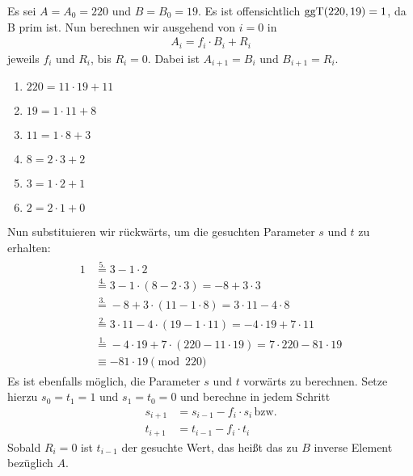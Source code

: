 \vspace{10pt}
\begin{beispiel}[EEA]
	Es sei $A = A_0 = 220 $ und $B = B_0 = 19$. Es ist offensichtlich $\operatorname{ggT}(220, 19) = 1$, da B prim ist. Nun berechnen wir ausgehend von $i = 0$ in
	\begin{align*}
		A_i = f_i \cdot B_i + R_i
	\end{align*}
	jeweils $f_i$ und $R_i$, bis $R_i = 0$. Dabei ist $A_{i+1} = B_i$ und $B_{i+1} = R_i$.
	\begin{enumerate}
		\item $220 = 11 \cdot 19 + 11$
		\item $19 = 1 \cdot 11 + 8$
		\item $11 = 1 \cdot 8 + 3$
		\item $8 = 2 \cdot 3 + 2$
		\item $3 = 1 \cdot 2 + 1$
		\item $2 = 2 \cdot 1 + 0$
	\end{enumerate}
	Nun substituieren wir rückwärts, um die gesuchten Parameter $s$ und $t$ zu erhalten:
	\begin{align*}
		\begin{split}
			1	&\stackrel{\textit{5.}}{=} 3 - 1 \cdot 2\\
				&\stackrel{\textit{4.}}{=} 3 - 1 \cdot (8 - 2 \cdot 3) = -8 + 3 \cdot 3\\
				&\stackrel{\textit{3.}}{=} -8 + 3 \cdot (11 - 1 \cdot 8) = 3 \cdot 11 - 4 \cdot 8\\
				&\stackrel{\textit{2.}}{=} 3 \cdot 11 - 4 \cdot (19 - 1 \cdot 11) = -4 \cdot 19 + 7 \cdot 11\\
				&\stackrel{\textit{1.}}{=} -4 \cdot 19 + 7 \cdot (220 - 11 \cdot 19) = 7 \cdot 220 - 81 \cdot 19\\[.5cm]
				&\equiv -81 \cdot 19 \pmod{220}
		\end{split}
	\end{align*}
	Es ist ebenfalls möglich, die Parameter $s$ und $t$ vorwärts zu berechnen. Setze hierzu $s_0 = t_1 = 1$ und $s_1 = t_0 = 0$ und berechne in jedem Schritt
	\begin{align*}
		s_{i+1} &= s_{i-1} - f_i \cdot s_i\, \text{bzw.}\\
		t_{i+1} &= t_{i-1} - f_i \cdot t_i
	\end{align*}
	Sobald $R_i = 0$ ist $t_{i-1}$ der gesuchte Wert, das heißt das zu $B$ inverse Element bezüglich $A$.
\end{beispiel}

